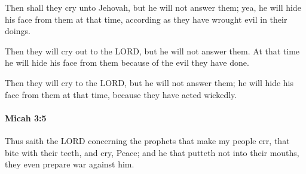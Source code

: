 			\begin{versebox}
					\item[BHS] 
					\item[LXX] 
					\item[ASV] Then shall they cry unto Jehovah, but he will not answer them; yea, he will hide his face from them at that time, according as they have wrought evil in their doings.
					\item[NIV] Then they will cry out to the LORD, but he will not answer them. At that time he will hide his face from them because of the evil they have done.
					\item[NRSV] Then they will cry to the LORD, but he will not answer them; he will hide his face from them at that time, because they have acted wickedly.
			\end{versebox}

		\paragraph{Micah 3:5} %
			\label{MICAH-3-5}

			Thus saith the LORD concerning the prophets that make my people err, that bite with their teeth, and cry, Peace; and he that putteth not into their mouths, they even prepare war against him.

